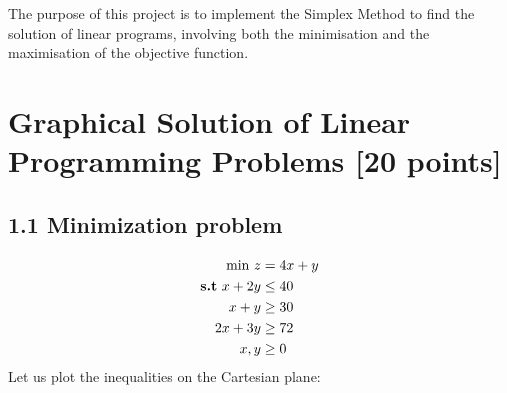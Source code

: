 \documentclass[unicode,11pt,a4paper,oneside,numbers=endperiod,openany]{scrartcl}
\begin{document}
\setassignment
{}

\newline

\assignmentpolicy


The purpose of this project is to implement the Simplex Method to find the solution of linear programs, involving both the minimisation and the maximisation of the objective function.
\tableofcontents
\clearpage

\section{Graphical Solution of Linear Programming Problems [20 points]}
\subsection*{1.1 Minimization problem}
\begin{equation*}
    \begin{split}
    \text{min  } z & = 4x+y \\
     \text{\textbf{s.t}  } x+2y&\leq 40\\
     x+y&\geq 30 \\
     2x+3y&\geq 72 \\
     x,y &\geq 0
    \end{split}
\end{equation*}
Let us plot the inequalities on the Cartesian plane:\\
\end{document}
